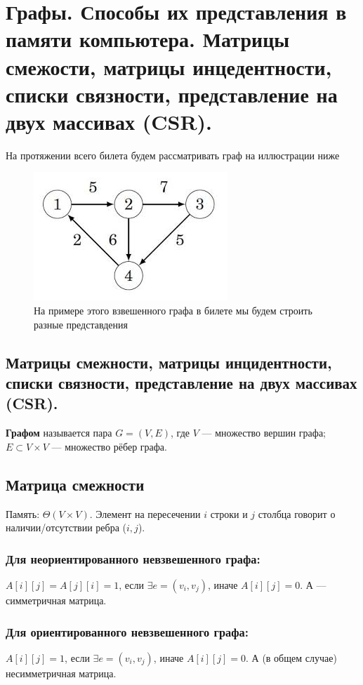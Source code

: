 \section{Графы. Способы их представления в памяти компьютера. Матрицы смежости, матрицы инцедентности, списки связности, представление на двух массивах (CSR).}

На протяжении всего билета будем рассматривать граф на иллюстрации ниже

\begin{figure}[h!]
	\centering
	\includegraphics[width=0.4\linewidth]{img_easy/5_1.png}
	\captionsetup{labelformat=empty}
	\caption{На примере этого взвешенного графа в билете мы будем строить разные представдения}
	\label{fig:51}
\end{figure}

\subsection*{Матрицы смежности, матрицы инцидентности, списки связности, представление на двух массивах (CSR).}

\begin{definition}
	\textbf{Графом} называется пара $G=(V, E)$, где $V$ --- множество вершин графа; $E \subset V \times V$ --- множество рёбер графа.
\end{definition}

\subsection{Матрица смежности}
Память: $\Theta(V \times V)$. Элемент на пересечении $i$ строки и $j$ столбца говорит о наличии/отсутствии ребра ($i, j$).

\subsubsection*{Для неориентированного невзвешенного графа:}
$A[i][j]=A[j][i]=1$, если $\exists e=(v_i, v_j)$, иначе $A[i][j]=0$.
А --- симметричная матрица.

\subsubsection*{Для ориентированного невзвешенного графа:}
$A[i][j]=1$, если $\exists e=(v_i, v_j)$, иначе $A[i][j]=0$.
А (в общем случае) несимметричная матрица.

